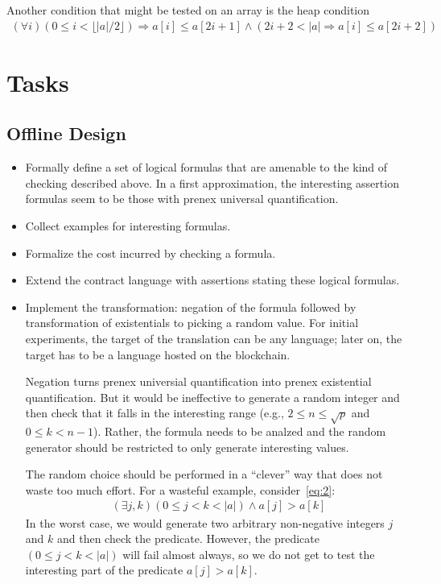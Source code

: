 \documentclass{article}
\begin{document}
Another condition that might be tested on an array is the heap condition
\begin{gather}
  \label{eq:3}
  (\forall i) (0 \le i < \lfloor|a|/2\rfloor) \Rightarrow a[i] \le a[2i+1] \wedge (2i+2
  < |a| \Rightarrow a[i] \le a[2i+2])
\end{gather}


\section{Tasks}
\label{sec:tasks}

\subsection{Offline Design}
\label{sec:offline-design}

\begin{itemize}
\item Formally define a set of logical formulas that are amenable to the kind of checking
  described above. In a first approximation, the interesting assertion formulas seem to
  be those with prenex universal quantification. 
\item Collect examples for interesting formulas.
\item Formalize the cost incurred by checking a formula.
\item Extend the contract language with assertions stating these logical formulas.
\item Implement the transformation: negation of the formula followed by transformation
  of existentials to picking a random value. For initial experiments, the target of the
  translation can be any language; later on, the target has to be a language hosted on
  the blockchain.

  Negation turns prenex universial quantification into prenex existential quantification. But it
  would be ineffective to generate a random integer and then check that it falls in the
  interesting range (e.g., $2\le n \le \sqrt p$ and $0\le k< n-1$). Rather, the formula
  needs to be analzed and the random generator should be restricted to only generate
  interesting values. 

  The random choice should be performed in a ``clever'' way that does not waste too
  much effort. For a wasteful example, consider~\eqref{eq:2}:
  \begin{gather*}
    (\exists j, k ) (0\le j< k < |a|) \wedge a[j] > a[k]
  \end{gather*}
  In the worst case, we would generate two arbitrary non-negative integers $j$ and $k$
  and then check the predicate. However, the predicate $(0\le j< k < |a|)$ will fail
  almost always, so we do not get to test the interesting part of the predicate
  $a[j]>a[k]$.


\end{itemize}
\end{document}

